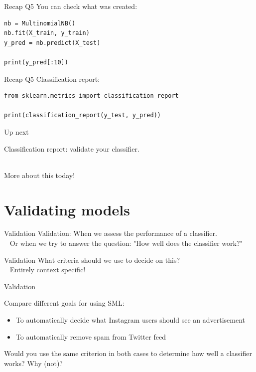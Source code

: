 \documentclass[compress]{beamer}
\begin{document}
\begin{frame}[fragile]{Recap Q5}
You can check what was created:
\begin{lstlisting}
nb = MultinomialNB()
nb.fit(X_train, y_train)
y_pred = nb.predict(X_test)

print(y_pred[:10])
\end{lstlisting}
	
\begin{lstlistingoutput}
\end{lstlistingoutput}
\end{frame}


\begin{frame}[fragile]{Recap Q5}
Classification report:
\begin{lstlisting}
from sklearn.metrics import classification_report
		
print(classification_report(y_test, y_pred))
\end{lstlisting}
	
\end{frame}


\begin{frame}{Up next}
	
Classification report: validate your classifier. \\\
	
More about this today!
\end{frame}


\section{Validating models}

\begin{frame}{Validation}
Validation: When we assess the performance of a classifier. \\\
\pause
Or when we try to answer the question: "How well does the classifier work?"
\end{frame}

\begin{frame}{Validation}
What criteria should we use to decide on this?\\\
\pause
Entirely context specific!
\end{frame}


\begin{frame}[fragile]{Validation}
\begin{alertblock}{Compare different goals for using SML:}
	\begin{itemize}
		\item To automatically decide what Instagram users should see an advertisement
		\item To automatically remove spam from Twitter feed
	\end{itemize}
\end{alertblock}

Would you use the same criterion in both cases to determine how well a classifier works? Why (not)?
\end{frame}
\end{document}
